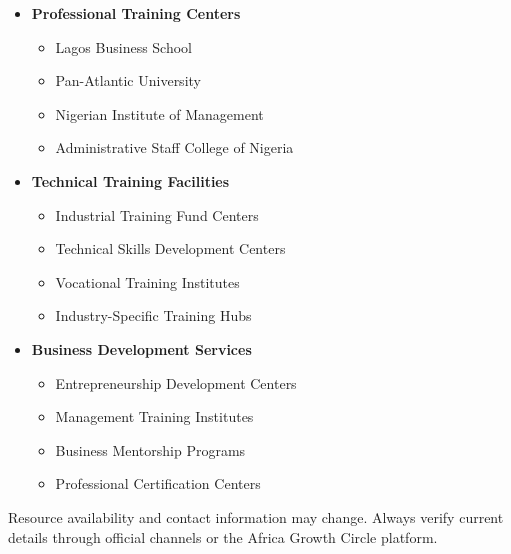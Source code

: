 \begin{tcolorbox}[
    colback=white,
    colframe=primarydark,
    title=\textbf{Skills Development Resources},
    before skip=1em,
    after skip=1em
]
    \begin{itemize}[leftmargin=*,itemsep=0.5em]
        \item \textbf{Professional Training Centers}
        \begin{itemize}[itemsep=0.3em]
            \item Lagos Business School
            \item Pan-Atlantic University
            \item Nigerian Institute of Management
            \item Administrative Staff College of Nigeria
        \end{itemize}

        \vspace{0.5em}

        \item \textbf{Technical Training Facilities}
        \begin{itemize}[itemsep=0.3em]
            \item Industrial Training Fund Centers
            \item Technical Skills Development Centers
            \item Vocational Training Institutes
            \item Industry-Specific Training Hubs
        \end{itemize}

        \vspace{0.5em}

        \item \textbf{Business Development Services}
        \begin{itemize}[itemsep=0.3em]
            \item Entrepreneurship Development Centers
            \item Management Training Institutes
            \item Business Mentorship Programs
            \item Professional Certification Centers
        \end{itemize}
    \end{itemize}
\end{tcolorbox}

\begin{warningbox}
    Resource availability and contact information may change. Always verify current details through official channels or the Africa Growth Circle platform.
\end{warningbox}

